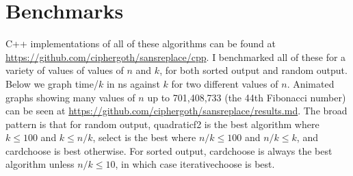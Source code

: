 \documentclass[letterpaper,luatex,11pt]{article}
\begin{document}
\inputminted{Python}{code/choose_binom.py}

\section{Benchmarks}

C++ implementations of all of these algorithms can be found at 
\url{https://github.com/ciphergoth/sansreplace/cpp}. I benchmarked
all of these for a variety of values of values of \(n\) and \(k\),
for both sorted output and random output. Below we graph time/\(k\)
in ns against \(k\) for two different values of \(n\).
Animated graphs showing many values of \(n\) up to 701,408,733
(the 44th Fibonacci number) can be seen at
\url{https://github.com/ciphergoth/sansreplace/results.md}.
The broad pattern is that for random output, quadraticf2
is the best algorithm where \(k \leq 100\) and \(k \leq n/k\), select
is the best where \(n/k \leq 100\) and \(n/k \leq k\), and cardchoose
is best otherwise. For sorted output, cardchoose is always the
best algorithm unless \(n/k \leq 10\), in which case iterativechoose
is best.

%



%


\printbibliography
\end{document}
